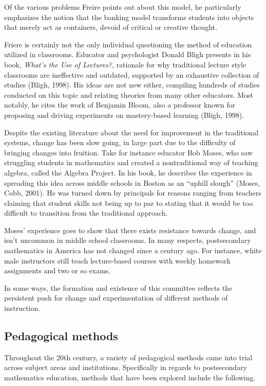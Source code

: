 Of the various problems Freire points out about this model, he particularly emphasizes the notion that the banking model transforms students into objects that merely act as containers, devoid of critical or creative thought.

Friere is certainly not the only individual questioning the method of education utilized in classrooms. Educator and psychologist Donald Bligh presents in his book, {\it What's the Use of Lectures?}, rationale for why traditional lecture style classrooms are ineffective and outdated, supported by an exhaustive collection of studies (Bligh, 1998). His ideas are not new either, compiling hundreds of studies conducted on this topic and relating theories from many other educators. Most notably, he cites the work of Benjamin Bloom, also a professor known for proposing and driving experiments on mastery-based learning (Bligh, 1998).

Despite the existing literature about the need for improvement in the traditional systems, change has been slow going, in large part due to the difficulty of bringing changes into fruition. Take for instance educator Bob Moses, who saw struggling students in mathematics and created a nontraditional way of teaching algebra, called the Algebra Project. In his book, he describes the experience in spreading this idea across middle schools in Boston as an ``uphill slough'' (Moses, Cobb, 2001). He was turned down by principals for reasons ranging from teachers claiming that student skills not being up to par to stating that it would be too difficult to transition from the traditional approach.

Moses' experience goes to show that there exists resistance towards change, and isn't uncommon in middle school classrooms. In many respects, postsecondary mathematics in America has not changed since a century ago. For instance, white male instructors still teach lecture-based courses with weekly homework assignments and two or so exams.

In some ways, the formation and existence of this committee reflects the  persistent push for change and experimentation of different methods of instruction.
\subsection{Pedagogical methods}
Throughout the 20th century, a variety of pedagogical methods came into trial across subject areas and institutions. Specifically in regards to postsecondary mathematics education, methods that have been explored include the following.

